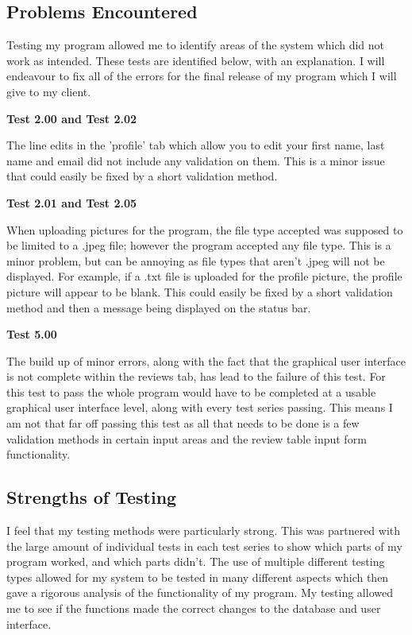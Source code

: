 \subsection{Problems Encountered}

Testing my program allowed me to identify areas of the system which did not work as intended. These tests are identified below, with an explanation. I will endeavour to fix all of the errors for the final release of my program which I will give to my client.

\textbf{Test 2.00 and Test 2.02 }

The line edits in the 'profile' tab which allow you to edit your first name, last name and email did not include any validation on them. This is a minor issue that could easily be fixed by a short validation method. 

\textbf{Test 2.01 and Test 2.05}

When uploading pictures for the program, the file type accepted was supposed to be limited to a .jpeg file; however the program accepted any file type. This is a minor problem, but can be annoying as file types that aren't .jpeg will not be displayed. For example, if a .txt file is uploaded for the profile picture, the profile picture will appear to be blank. This could easily be fixed by a short validation method and then a message being displayed on the status bar.


\textbf{Test 5.00}

The build up of minor errors, along with the fact that the graphical user interface is not complete within the reviews tab, has lead to the failure of this test. For this test to pass the whole program would have to be completed at a usable graphical user interface level, along with every test series passing. This means I am not that far off passing this test as all that needs to be done is a few validation methods in certain input areas and the review table input form functionality.

\subsection{Strengths of Testing}

I feel that my testing methods were particularly strong. This was partnered with the large amount of individual tests in each test series to show which parts of my program worked, and which parts didn't. The use of multiple different testing types allowed for my system to be tested in many different aspects which then gave a rigorous analysis of the functionality of my program. My testing allowed me to see if the functions made the correct changes to the database and user interface.

